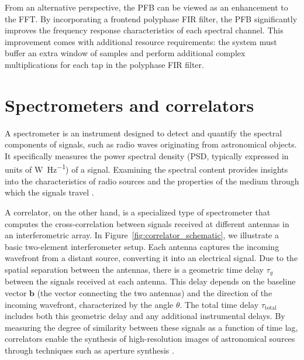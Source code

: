 From an alternative perspective, the PFB can be viewed as an enhancement to the FFT. By incorporating a frontend polyphase FIR filter, the PFB significantly improves the frequency response characteristics of each spectral channel. This improvement comes with additional resource requirements: the system must buffer an extra window of samples and perform additional complex multiplications for each tap in the polyphase FIR filter.

\section{Spectrometers and correlators}
A spectrometer is an instrument designed to detect and quantify the spectral components of signals, such as radio waves originating from astronomical objects. It specifically measures the power spectral density (PSD, typically expressed in units of \si{\watt \per \hertz}) of a signal. Examining the spectral content provides insights into the characteristics of radio sources and the properties of the medium through which the signals travel \citep{Price2016spectrometers}.

A correlator, on the other hand, is a specialized type of spectrometer that computes the cross-correlation between signals received at different antennas in an interferometric array. In Figure~\ref{fig:correlator_schematic}, we illustrate a basic two-element interferometer setup. Each antenna captures the incoming wavefront from a distant source, converting it into an electrical signal. Due to the spatial separation between the antennas, there is a geometric time delay $\tau_g$ between the signals received at each antenna. This delay depends on the baseline vector $\mathbf{b}$ (the vector connecting the two antennas) and the direction of the incoming wavefront, characterized by the angle $\theta$. The total time delay $\tau_\text{total}$ includes both this geometric delay and any additional instrumental delays.
By measuring the degree of similarity between these signals as a function of time lag, correlators enable the synthesis of high-resolution images of astronomical sources through techniques such as aperture synthesis \citep{thompson2017interferometry}. 

